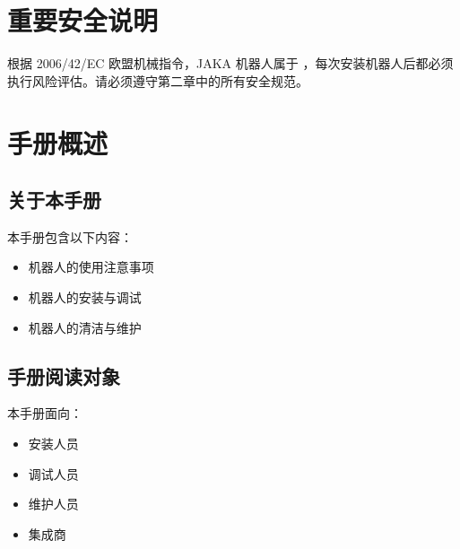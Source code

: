 \documentclass[a4paper,11pt,english,openany,oneside]{sphinxmanual}
\begin{document}
\chapter{重要安全说明}
\label{\detokenize{02 _u524d_u8a00:id2}}
\sphinxAtStartPar
根据 2006/42/EC 欧盟机械指令，JAKA 机器人属于  ，每次安装机器人后都必须执行风险评估。请必须遵守第二章中的所有安全规范。

\sphinxstepscope


\chapter{手册概述}
\label{\detokenize{04 _u624b_u518c_u6982_u8ff0:id1}}\label{\detokenize{04 _u624b_u518c_u6982_u8ff0::doc}}

\section{关于本手册}
\label{\detokenize{04 _u624b_u518c_u6982_u8ff0:id2}}
\sphinxAtStartPar
本手册包含以下内容：
\begin{itemize}
\item {} 
\sphinxAtStartPar
机器人的使用注意事项

\item {} 
\sphinxAtStartPar
机器人的安装与调试

\item {} 
\sphinxAtStartPar
机器人的清洁与维护

\end{itemize}


\section{手册阅读对象}
\label{\detokenize{04 _u624b_u518c_u6982_u8ff0:id3}}
\sphinxAtStartPar
本手册面向：
\begin{itemize}
\item {} 
\sphinxAtStartPar
安装人员

\item {} 
\sphinxAtStartPar
调试人员

\item {} 
\sphinxAtStartPar
维护人员

\item {} 
\sphinxAtStartPar
集成商

\end{itemize}
\end{document}
